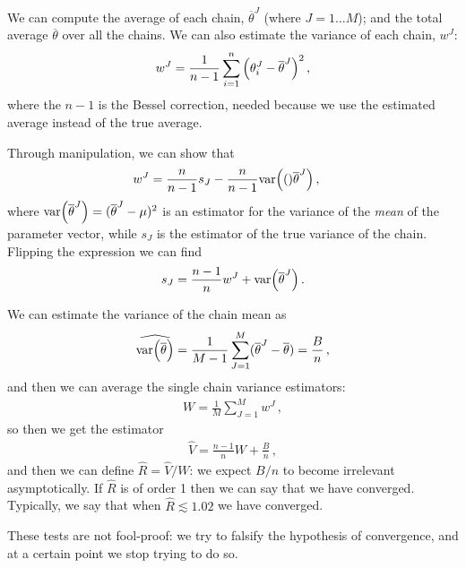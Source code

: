 \documentclass[main.tex]{subfiles}
\begin{document}
We can compute the average of each chain, \(\overline{\theta}^{J}\) (where \(J = 1 \dots M\)); and the total average \(\overline{\theta}\) over all the chains. 
We can also estimate the variance of each chain, \(w^{J}\): 
%
\begin{align}
w^{J} = \frac{1}{n-1} \sum_{i=1}^{n} \qty(\theta^{J}_{i} - \overline{\theta}^{J})^2
\,,
\end{align}
%
where the \(n-1\) is the Bessel correction, needed because we use the estimated average instead of the true average. 

Through manipulation, we can show that 
%
\begin{align}
w^{J} &= \frac{n}{n-1} s_J - \frac{n}{n-1} \text{var} \qty(()\overline{\theta}^{J})
\,,
\end{align}
%
where \(\text{var} \qty(\overline{\theta}^J) = (\overline{\theta}^{J} - \mu )^2\) is an estimator for the variance of the \emph{mean} of the parameter vector, while \(s_J\) is the estimator of the true variance of the chain. 
Flipping the expression we can find 
%
\begin{align}
s_J = \frac{n-1}{n} w^{J} + \text{var} \qty(\overline{\theta}^{J})
\,.
\end{align}

We can estimate the variance of the chain mean as 
%
\begin{align}
\widehat{\text{var} \qty(\overline{\theta})} = \frac{1}{M-1} \sum _{J=1}^{M} (\overline{\theta}^{J}- \overline{\theta}) = \frac{B}{n}
\,,
\end{align}
%
and then we can average the single chain variance estimators: 
%
\begin{align}
W = \frac{1}{M} \sum _{J=1}^{M} w^{J}
\,,
\end{align}
%
so then we get the estimator 
%
\begin{align}
\hat{V} = \frac{n-1}{n} W + \frac{B}{n}
\,,
\end{align}
%
and then we can define \(\hat{R} = \hat{V} / W\): we expect \(B/n\) to become irrelevant asymptotically. 
If \(\hat{R}\) is of order 1 then we can say that we have converged. 
Typically, we say that when \(\hat{R} \lesssim \num{1.02}\) we have converged. 


These tests are not fool-proof: we try to falsify the hypothesis of convergence, and at a certain point we stop trying to do so. 
\end{document}
